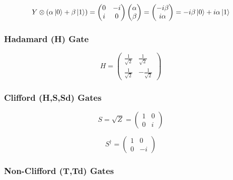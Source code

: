 \begin{equation}
\label{equ:yverification}
Y \otimes (\alpha \ket{0} + \beta \ket{1}) = \begin{pmatrix}
 0 & -i \\ 
 i & 0
 \end{pmatrix} \begin{pmatrix}
 \alpha  \\ 
 \beta
 \end{pmatrix} = \begin{pmatrix}
 -i\beta  \\ 
 i\alpha
 \end{pmatrix} = -i\beta \ket{0} + i\alpha \ket{1}
\end{equation}

\subsubsection{Hadamard (H) Gate}
\label{subsubsubsec:hadamardgate}

\begin{equation}
H = \begin{pmatrix}
 \frac{1}{\sqrt{2}} & \frac{1}{\sqrt{2}} \\ 
 \frac{1}{\sqrt{2}} & -\frac{1}{\sqrt{2}}
 \end{pmatrix}
\end{equation}

\subsubsection{Clifford (H,S,Sd) Gates}
\label{subsubsubsec:cliffordgates}

\begin{equation}
S = \sqrt{Z} = \begin{pmatrix}
 1 & 0 \\ 
 0 & i
 \end{pmatrix}
\end{equation}

\begin{equation}
S^\dagger = \begin{pmatrix}
 1 & 0 \\ 
 0 & -i
 \end{pmatrix}
\end{equation}

\subsubsection{Non-Clifford (T,Td) Gates}
\label{subsubsubsec:noncliffordgates}

